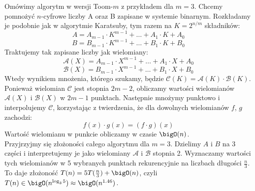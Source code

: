 Omówimy algorytm w wersji Toom-\(m\) z przykładem dla \( m = 3 \). Chcemy pomnożyć \(n\)-cyfrowe liczby A oraz B zapisane w systemie binarnym.
Rozkładamy je podobnie jak w algorytmie Karatsuby, tym razem na \( K = 2^{n / m} \) składników:
\[
    A = A_{m-1} \cdot K^{m-1} + \dots + A_1 \cdot K + A_0
\]
\[
    B = B_{m-1} \cdot K^{m-1} + \dots + B_1 \cdot K + B_0
\]
Traktujemy tak zapisane liczby jak wielomiany:
\[
    \mathcal{A}(X) = A_{m-1} \cdot X^{m-1} + \dots + A_1 \cdot X + A_0
\]
\[
    \mathcal{B}(X) = B_{m-1} \cdot X^{m-1} + \dots + B_1 \cdot X + B_0
\]
Wtedy wynikiem mnożenia, którego szukamy, będzie \( \mathcal{C}(K) = \mathcal{A}(K) \cdot \mathcal{B}(K) \). Ponieważ wielomian \( \mathcal{C} \) jest stopnia \( 2m-2 \), obliczamy wartości wielomianów \( \mathcal{A}(X) \) i \( \mathcal{B}(X) \) w \( 2m-1 \) punktach.
Następnie mnożymy punktowo i interpolujemy \( \mathcal{C} \), korzystając z twierdzenia, że dla dowolnych wielomianów \( f \), \( g \) zachodzi:
\[
    f(x) \cdot g(x) = (f \cdot g)(x)
\]
Wartość wielomianu w punkcie obliczamy w czasie \( \bigO(n) \). \\
Przyjrzyjmy się złożoności całego algorytmu dla \( m = 3 \). Dzielimy \( A \) i \( B \) na 3 części i interpretujemy je jako wielomiany \( \mathcal{A} \) i \( \mathcal{B} \) stopnia 2. Wyznaczamy wartości tych wielomianów w 5 wybranych punktach rekurencyjnie na liczbach długości \( \frac{n}{3} \). To daje złożoność \( T(n) = 5T(\frac{n}{3}) + \bigO(n) \), czyli \( T(n) \in \bigO(n^{\log_3 5}) \approx \bigO(n^{1.46}) \).